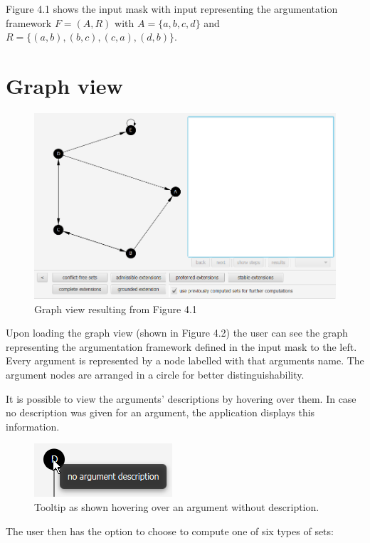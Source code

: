 \documentclass[draft,final]{vutinfth} %
\newcommand{\hl}{\par\vspace{6pt}} %
\begin{document}
Figure 4.1 shows the input mask with input representing the argumentation framework $F=(A,R)$ with $A=\{a,b,c,d\}$ and $R=\{(a,b),(b,c),(c,a),(d,b)\}$.\hl

\section{Graph view}

\FloatBarrier
	\begin{figure}[!h]
		\centering
		\includegraphics[width=\linewidth]{pics/graph.png}
		\caption{Graph view resulting from Figure 4.1}
	\end{figure}
\FloatBarrier

Upon loading the graph view (shown in Figure 4.2) the user can see the graph representing the argumentation framework defined in the input mask to the left. Every argument is represented by a node labelled with that arguments name. The argument nodes are arranged in a circle for better distinguishability.\hl
It is possible to view the arguments' descriptions by hovering over them. In case no description was given for an argument, the application displays this information.\hl

\FloatBarrier
	\begin{figure}[!h]
		\centering
		\includegraphics[scale=2]{pics/argdes.png}
		\caption{Tooltip as shown hovering over an argument without description.}
	\end{figure}
\FloatBarrier

The user then has the option to choose to compute one of six types of sets:
\end{document}

